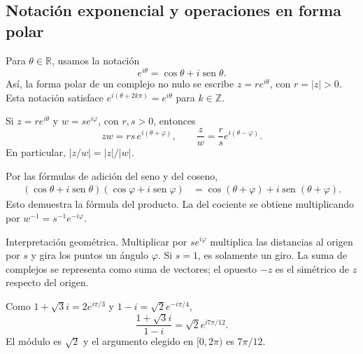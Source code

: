\subsection{Notación exponencial y operaciones en forma polar}
\begin{definicion}
Para $\theta\in\mathbb R$, usamos la notación
\[
e^{i\theta}=\cos\theta+i\operatorname{sen}\theta.
\]
Así, la forma polar de un complejo no nulo se escribe $z=re^{i\theta}$,
con $r=|z|>0$. Esta notación satisface
$e^{i(\theta+2k\pi)}=e^{i\theta}$ para $k\in\mathbb Z$.
\end{definicion}
\begin{proposicion}[{title={Producto y cociente en forma polar}}]
Si $z=re^{i\theta}$ y $w=se^{i\varphi}$, con $r,s>0$, entonces
\[
zw=rs\,e^{i(\theta+\varphi)},\qquad
\frac zw=\frac rs e^{i(\theta-\varphi)}.
\]
En particular, $|z/w|=|z|/|w|$.
\end{proposicion}
\begin{demostracion}
Por las fórmulas de adición del seno y del coseno,
\begin{align*}
(\cos\theta+i\operatorname{sen}\theta)
(\cos\varphi+i\operatorname{sen}\varphi)
&=\cos(\theta+\varphi)+i\operatorname{sen}(\theta+\varphi).
\end{align*}
Esto demuestra la fórmula del producto. La del cociente se obtiene
multiplicando por $w^{-1}=s^{-1}e^{-i\varphi}$.
\end{demostracion}
\begin{nota}{Interpretación geométrica.}
Multiplicar por $se^{i\varphi}$ multiplica las distancias al origen por $s$
y gira los puntos un ángulo $\varphi$. Si $s=1$, es solamente un giro.
La suma de complejos se representa como suma de vectores; el opuesto
$-z$ es el simétrico de $z$ respecto del origen.
\end{nota}
\begin{ejemplo}
Como $1+\sqrt3 i=2e^{i\pi/3}$ y $1-i=\sqrt2e^{-i\pi/4}$,
\[
\frac{1+\sqrt3 i}{1-i}=\sqrt2e^{i7\pi/12}.
\]
El módulo es $\sqrt2$ y el argumento elegido en $[0,2\pi)$ es $7\pi/12$.
\end{ejemplo}
